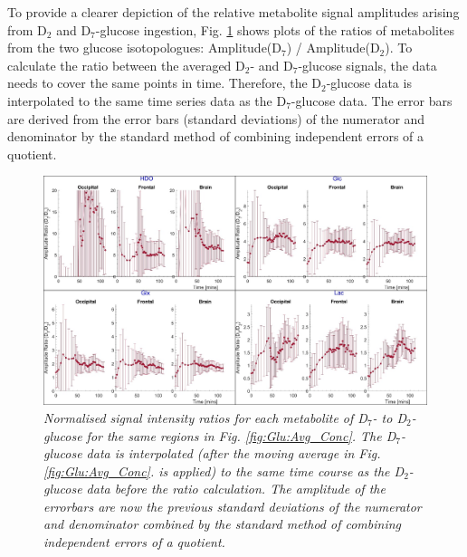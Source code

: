 To provide a clearer depiction of the relative metabolite signal amplitudes arising from D$_2$ and D$_7$-glucose ingestion, Fig. \ref{fig:Glu:D7_D2} shows plots of the ratios of metabolites from the two glucose isotopologues: Amplitude(D$_7$) / Amplitude(D$_2$). To calculate the ratio between the averaged D$_2$- and D$_7$-glucose signals, the data needs to cover the same points in time. Therefore, the D$_2$-glucose data is interpolated to the same time series data as the D$_7$-glucose data. The error bars are derived from the error bars (standard deviations) of the numerator and denominator by the standard method of combining independent errors of a quotient. 

\begin{figure}
    \centering
    \includegraphics[width = 1\textwidth]{Figures/Glucose/D7_D2.png}
    \caption{\textit{Normalised signal intensity ratios for each metabolite of D$_7$- to D$_2$-glucose for the same regions in Fig. \ref{fig:Glu:Avg_Conc}. The D$_7$-glucose data is interpolated (after the moving average in Fig. \ref{fig:Glu:Avg_Conc}. is applied) to the same time course as the D$_2$-glucose data before the ratio calculation. The amplitude of the errorbars are now the previous standard deviations of the numerator and denominator combined by the standard method of combining independent errors of a quotient.}}
    \label{fig:Glu:D7_D2}
\end{figure}

